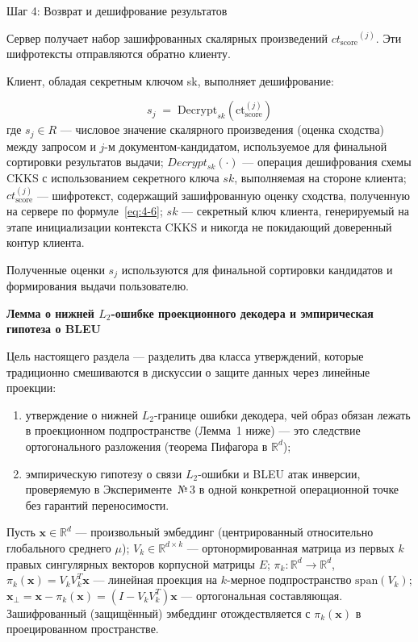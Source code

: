 \documentclass[a4paper, 12pt, oneside, openany]{article}
\begin{document}
Шаг 4: Возврат и дешифрование результатов

Сервер получает набор зашифрованных скалярных произведений \({{ct}_{\mathrm{score}}}^{(j)}\). Эти шифротексты отправляются обратно клиенту.

Клиент, обладая секретным ключом sk, выполняет дешифрование:

\begin{equation}
	s_{j} \;=\; \mathrm{Decrypt}_{sk}\!\left( \mathrm{ct}_{\mathrm{score}}^{(j)} \right)
	\label{eq:4-7}
\end{equation}
где \(s_{j} \in R\) --- числовое значение скалярного произведения (оценка сходства) между запросом и \(j\)-м документом-кандидатом, используемое для финальной сортировки результатов выдачи; \(Decrypt_{sk}( \cdot )\) --- операция дешифрования схемы CKKS с использованием секретного ключа \(sk\), выполняемая на стороне клиента; \(ct_{\mathrm{score}}^{(j)}\) --- шифротекст, содержащий зашифрованную оценку сходства, полученную на сервере по формуле~\eqref{eq:4-6}; \(sk\) --- секретный ключ клиента, генерируемый на этапе инициализации контекста CKKS и никогда не покидающий доверенный контур клиента.

Полученные оценки \(s_{j}\) используются для финальной сортировки кандидатов и формирования выдачи пользователю.

\textbf{Лемма о нижней $L_2$-ошибке проекционного декодера и эмпирическая гипотеза о BLEU}

Цель настоящего раздела --- разделить два класса утверждений, которые традиционно смешиваются в дискуссии о защите данных через линейные проекции:

\begin{enumerate}
	\item утверждение о нижней $L_2$-границе ошибки декодера, чей образ обязан лежать в проекционном подпространстве (Лемма~1 ниже) --- это следствие ортогонального разложения (теорема Пифагора в $\mathbb{R}^{d}$); 
	\item эмпирическую гипотезу о связи $L_2$-ошибки и BLEU атак инверсии, проверяемую в Эксперименте~№\,3 в одной конкретной операционной точке без гарантий переносимости.
\end{enumerate}


 Пусть $\mathbf{x} \in \mathbb{R}^{d}$ --- произвольный эмбеддинг (центрированный относительно глобального среднего $\mu$); $V_k \in \mathbb{R}^{d \times k}$ --- ортонормированная матрица из первых $k$ правых сингулярных векторов корпусной матрицы $E$; $\pi_k: \mathbb{R}^{d} \to \mathbb{R}^{d}$, $\pi_k(\mathbf{x}) = V_k V_k^{T} \mathbf{x}$ --- линейная проекция на $k$-мерное подпространство $\mathrm{span}(V_k)$; $\mathbf{x}_{\perp} = \mathbf{x} - \pi_k(\mathbf{x}) = (I - V_k V_k^{T})\mathbf{x}$ --- ортогональная составляющая. Зашифрованный (защищённый) эмбеддинг отождествляется с $\pi_k(\mathbf{x})$ в проецированном пространстве.
\end{document}
